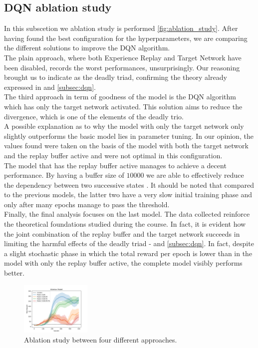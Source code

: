 \documentclass{article}
\begin{document}
\subsection{DQN ablation study}
\label{subsec:dqn-ablation-study}
In this subscetion we ablation study is performed \autoref{fig:ablation_study}. 
After having found the best configuration for the hyperparameters, we are comparing the different solutions to improve the DQN algorithm.\\
The plain approach, where both Experience Replay and Target Network have been disabled, records the worst performances, unsurprisingly. 
Our reasoning brought us to indicate as the deadly triad, confirming the theory already expressed in \cite{DBLP:books/sp/Plaat22} and \autoref{subsec:dqn}.\\
The third approach in term of goodness of the model is the DQN algorithm which has only the target network activated. 
This solution aims to reduce the divergence, which is one of the elements of the deadly trio. \\
A possible explanation as to why the model with only the target network only slightly outperforms the basic model lies in parameter tuning. 
In our opinion, the values found were taken on the basis of the model with both the target network and the replay buffer active and were not optimal in this configuration. \\
The model that has the replay buffer active manages to achieve a decent performance. By having a buffer size of $10000$ we are able to effectively reduce the dependency between two successive states \cite{DBLP:books/sp/Plaat22}. 
It should be noted that compared to the previous models, the latter two have a very slow initial training phase and only after many epochs manage to pass the threshold.\\
Finally, the final analysis focuses on the last model. The data collected reinforce the theoretical foundations studied during the course. 
In fact, it is evident how the joint combination of the replay buffer and the target network succeeds in limiting the harmful effects of the deadly triad -  \cite{DBLP:books/sp/Plaat22} and \autoref{subsec:dqn}. 
In fact, despite a slight stochastic phase in which the total reward per epoch is lower than in the model with only the replay buffer active, the complete model visibly performs better. \\

\begin{figure}[ht!]
   \centering
   \includegraphics[width=0.3\textwidth]{assets/Ablation/ablation_study.png}
   \caption{Ablation study between four different approaches. 
   }
   \label{fig:ablation_study}
\end{figure}
\end{document}
